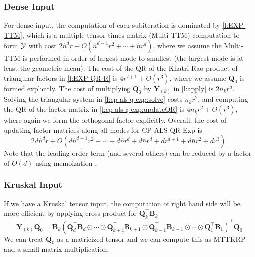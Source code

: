 \documentclass{article}
\newcommand{\mat}[1]{\mathbf{#1}}
\newcommand{\T}[2][]{#1{\mathbf{\cal{#2}}}} 						%
\begin{document}
\subsubsection{Dense Input}
For dense input, the computation of each subiteration is dominated by \cref{l:EXP-TTM}, which is a multiple tensor-times-matrix (Multi-TTM) computation to form $\T{Y}$ with cost
$2\hat{n}^dr+O(\hat{n}^{d-1}r^2 + \cdots + \hat{n}r^d)$, where we assume the Multi-TTM is performed in order of largest mode to smallest (the largest mode is at least the geometric mean).
The cost of the QR of the Khatri-Rao product of triangular factors in \cref{l:EXP-QR-R} is $4r^{d+1}+O(r^3)$, where we assume $\mat{Q}_0$ is formed explicitly.
The cost of multiplying $\mat{Q}_0$ by $\mat{Y}_{(k)}$ in \cref{l:apply} is $2n_kr^d$.
Solving the triangular system in \cref{l:cp-als-q-exp:solve} costs $n_kr^2$, and computing the QR of the factor matrix in \cref{l:cp-als-q-exp:updateQR} is $4n_kr^2+O(r^3)$, where again we form the orthogonal factor explicitly.
%
Overall, the cost of updating factor matrices along all modes for CP-ALS-QR-Exp is
$$2d\hat{n}^dr + O(d\hat{n}^{d-1}r^2 + \cdots + d\hat{n}r^d + d\bar{n}r^d+ dr^{d+1} + d\bar{n}r^2 + dr^3 ).$$
Note that the leading order term (and several others) can be reduced by a factor of $O(d)$ using memoization \cite{KR19}.

\subsubsection{Kruskal Input}
If we have a Kruskal tensor input, the computation of right hand side will be more efficient by applying cross product for $\mat{Q}_k^\top\mat{B}_k$
\begin{equation}
  \mat{Y}_{(k)}\mat{Q}_0= \mat{B}_k(\mat{Q}_d^\top\mat{B}_d \odot \cdots \odot \mat{Q}_{k+1}^\top\mat{B}_{k+1} \odot \mat{Q}_{k-1}^\top\mat{B}_{k-1} \odot \cdots \odot \mat{Q}_1^\top\mat{B}_1)^\top\mat{Q}_0 \nonumber
\end{equation}
We can treat $\mat{Q}_0$ as a matricized tensor and we can compute this as MTTKRP and a small matrix multiplication.
\end{document}
